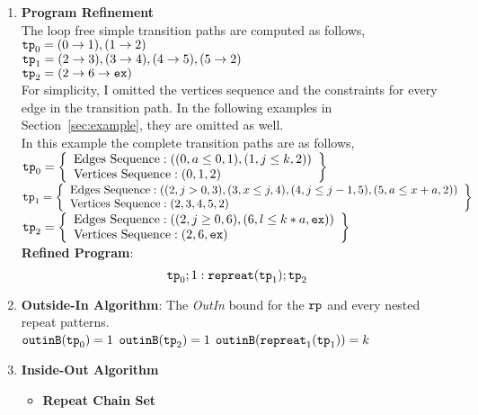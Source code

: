 \begin{enumerate}
    \item \textbf{Program Refinement}
    \\
    The loop free simple transition paths are computed as follows,
    \\
  $\mathtt{tp}_0 =  (0 \to 1), (1 \to 2)$
  \\
  $\mathtt{tp}_1 =  (2 \to 3), (3 \to 4), (4 \to 5), (5 \to 2)$
  \\
  $\mathtt{tp}_2 = (2 \to 6 \to \mathtt{ex})$
  \\
  For simplicity, I omitted the vertices sequence and the constraints for every edge in the transition path. 
  In the following examples in Section~\ref{sec:example}, they 
  are omitted as well. 
  \\
  In this example the complete transition paths are as follows,
  \\
  $\tpath_0 =  
    \left\{ \begin{array}{l}
    \text{Edges Sequence}: ((0, a \leq 0, 1), (1, j \leq k, 2))
    \\
    \text{Vertices Sequence}: (0, 1, 2)
    \end{array}\right\}
  $
  \\
  $\tpath_1 =  
  \left\{ \begin{array}{l}
    \text{Edges Sequence}: ((2, j > 0, 3), (3, x \leq j, 4), (4, j \leq j - 1, 5), (5, a \leq x + a, 2))
    \\
    \text{Vertices Sequence}: (2, 3, 4, 5, 2)
    \end{array}\right\}
  $
  \\
  $\tpath_2 = 
  \left\{ \begin{array}{l}
    \text{Edges Sequence}: ((2, j \geq 0, 6), (6, l \leq k*a, \lex))
    \\
    \text{Vertices Sequence}: (2, 6, \lex)
    \end{array}\right\}
    $
  \\
  \textbf{Refined Program}:
  \[
    \mathtt{tp}_0 ; 1: \mathtt{repreat}(\mathtt{tp}_1); \mathtt{tp}_2
  \]
  \item \textbf{Outside-In Algorithm}: The \emph{OutIn} bound for the $\mathtt{rp}$ and every nested repeat patterns.
  \\
  $\mathtt{outinB}(\mathtt{tp}_0) = 1$
  \quad
  $\mathtt{outinB}(\mathtt{tp}_2) = 1$
  \quad
  $\mathtt{outinB}(\mathtt{repreat}_1(\mathtt{tp}_1)) = k $
  \item \textbf{Inside-Out Algorithm}
  \begin{itemize}
    \item \textbf{Repeat Chain Set}

\end{itemize}
\end{enumerate}
